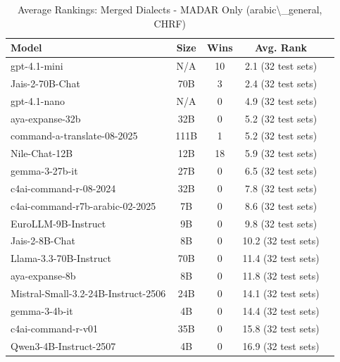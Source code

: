 \begin{table}[htbp]
\centering
\caption{Average Rankings: Merged Dialects - MADAR Only (arabic\textbackslash{}_general, CHRF)}
\label{tab:avg_rankings_chrf_arabic_general}
\begin{tabular}{l@{\hspace{3pt}}c@{\hspace{3pt}}c@{\hspace{3pt}}c@{\hspace{3pt}}c}
\toprule
Model & Size & Wins & Avg. Rank \\
\midrule
gpt-4.1-mini & N/A & 10 & 2.1 (32 test sets) \\
Jais-2-70B-Chat & 70B & 3 & 2.4 (32 test sets) \\
gpt-4.1-nano & N/A & 0 & 4.9 (32 test sets) \\
aya-expanse-32b & 32B & 0 & 5.2 (32 test sets) \\
command-a-translate-08-2025 & 111B & 1 & 5.2 (32 test sets) \\
Nile-Chat-12B & 12B & 18 & 5.9 (32 test sets) \\
gemma-3-27b-it & 27B & 0 & 6.5 (32 test sets) \\
c4ai-command-r-08-2024 & 32B & 0 & 7.8 (32 test sets) \\
c4ai-command-r7b-arabic-02-2025 & 7B & 0 & 8.6 (32 test sets) \\
EuroLLM-9B-Instruct & 9B & 0 & 9.8 (32 test sets) \\
Jais-2-8B-Chat & 8B & 0 & 10.2 (32 test sets) \\
Llama-3.3-70B-Instruct & 70B & 0 & 11.4 (32 test sets) \\
aya-expanse-8b & 8B & 0 & 11.8 (32 test sets) \\
Mistral-Small-3.2-24B-Instruct-2506 & 24B & 0 & 14.1 (32 test sets) \\
gemma-3-4b-it & 4B & 0 & 14.4 (32 test sets) \\
c4ai-command-r-v01 & 35B & 0 & 15.8 (32 test sets) \\
Qwen3-4B-Instruct-2507 & 4B & 0 & 16.9 (32 test sets) \\
\bottomrule
\end{tabular}
\end{table}